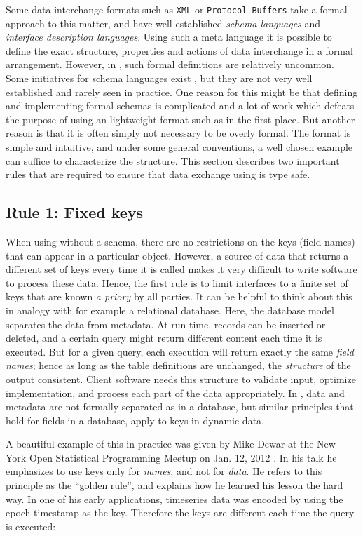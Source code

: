 Some data interchange formats such as \texttt{XML} or \texttt{Protocol Buffers} take a formal approach to this matter, and have well established \emph{schema languages} and \emph{interface description languages}. Using such a meta language it is possible to define the exact structure, properties and actions of data interchange in a formal arrangement. However, in \JSON, such formal definitions are relatively uncommon. Some initiatives for \JSON schema languages exist \citep{jsonschema}, but they are not very well established and rarely seen in practice. One reason for this might be that defining and implementing formal schemas is complicated and a lot of work which defeats the purpose of using an lightweight format such as \JSON in the first place. But another reason is that it is often simply not necessary to be overly formal. The \JSON format is simple and intuitive, and under some general conventions, a well chosen example can suffice to characterize the structure. This section describes two important rules that are required to ensure that data exchange using \JSON is type safe.

\subsection{Rule 1: Fixed keys}

When using \JSON without a schema, there are no restrictions on the keys (field names) that can appear in a particular object. However, a source of data that returns a different set of keys every time it is called makes it very difficult to write software to process these data. Hence, the first rule is to limit \JSON interfaces to a finite set of keys that are known \emph{a priory} by all parties. It can be helpful to think about this in analogy with for example a relational database. Here, the database model separates the data from metadata. At run time, records can be inserted or deleted, and a certain query might return different content each time it is executed. But for a given query, each execution will return exactly the same \emph{field names}; hence as long as the table definitions are unchanged, the \emph{structure} of the output consistent. Client software needs this structure to validate input, optimize implementation, and process each part of the data appropriately. In \JSON, data and metadata are not formally separated as in a database, but similar principles that hold for fields in a database, apply to keys in dynamic \JSON data.  
 
A beautiful example of this in practice was given by Mike Dewar at the New York Open Statistical Programming Meetup on Jan. 12, 2012 \citep{jsonkeys}. In his talk he emphasizes to use \JSON keys only for \emph{names}, and not for \emph{data}. He refers to this principle as the ``golden rule'', and explains how he learned his lesson the hard way. In one of his early applications, timeseries data was encoded by using the epoch timestamp as the \JSON key. Therefore the keys are different each time the query is executed:

